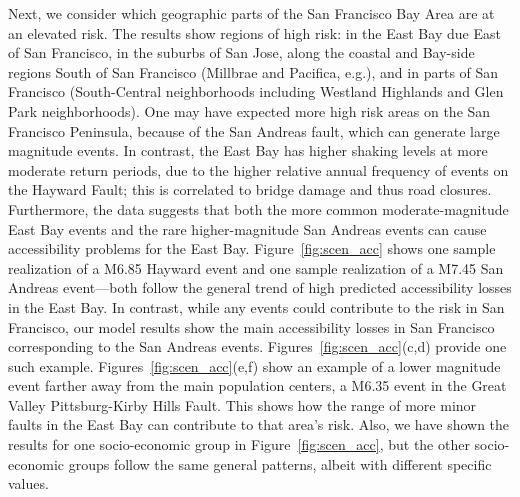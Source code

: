 




Next, we consider which geographic parts of the San Francisco Bay Area are at an elevated risk. The results show regions of high risk: in the East Bay due East of San Francisco, in the suburbs of San Jose, along the coastal and Bay-side regions South of San Francisco (Millbrae and Pacifica, e.g.), and in parts of San Francisco (South-Central neighborhoods including Westland Highlands and Glen Park neighborhoods). One may have expected more high risk areas on the San Francisco Peninsula, because of the San Andreas fault, which can generate large magnitude events. In contrast, the East Bay has higher shaking levels at more moderate return periods, due to the higher relative annual frequency of events on the Hayward Fault; this is correlated to bridge damage and thus road closures. Furthermore, the data suggests that both the more common moderate-magnitude East Bay events and the rare higher-magnitude San Andreas events can cause accessibility problems for the East Bay. Figure~\ref{fig:scen_acc} shows one sample realization of a M6.85 Hayward event and one sample realization of a M7.45 San Andreas event---both follow the general trend of  high predicted accessibility losses in the East Bay.
In contrast, while any events could contribute to the risk in San Francisco, our model results show the main accessibility losses in San Francisco corresponding to the San Andreas events.
Figures~\ref{fig:scen_acc}{(c,d)} provide one such example. Figures~\ref{fig:scen_acc}{(e,f)} show an example of a lower magnitude event farther away from the main population centers, a M6.35 event in the Great Valley Pittsburg-Kirby Hills Fault. This shows how the range of more minor faults in the East Bay can contribute to that area's risk.
Also, we have shown the results for one socio-economic group in Figure~\ref{fig:scen_acc}, but the other socio-economic groups follow the same general patterns, albeit with different specific values.


